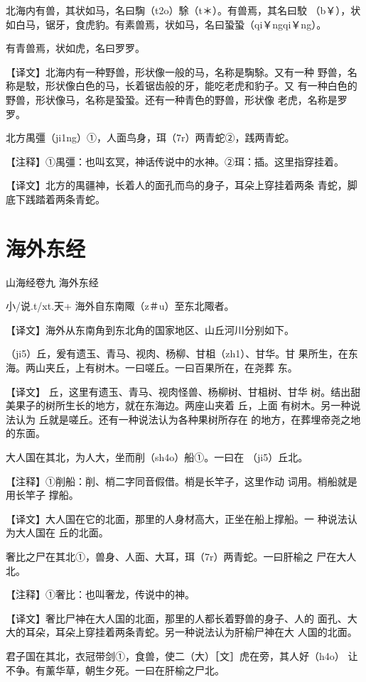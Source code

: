 \documentclass[a4paper,12pt,UTF8,twoside]{ctexbook}
\begin{document}
北海内有兽，其状如马，名曰騊（t2o）駼（t＊）。有兽焉，其名曰駮 （b￥），状如白马，锯牙，食虎豹。有素兽焉，状如马，名曰蛩蛩（qi￥ngqi￥ng）。

有青兽焉，状如虎，名曰罗罗。

【译文】北海内有一种野兽，形状像一般的马，名称是騊駼。又有一种 野兽，名称是駮，形状像白色的马，长着锯齿般的牙，能吃老虎和豹子。又 有一种白色的野兽，形状像马，名称是蛩蛩。还有一种青色的野兽，形状像 老虎，名称是罗罗。

北方禺彊（ji1ng）①，人面鸟身，珥（7r）两青蛇②，践两青蛇。

【注释】①禺彊：也叫玄冥，神话传说中的水神。②珥：插。这里指穿挂着。

【译文】北方的禺疆神，长着人的面孔而鸟的身子，耳朵上穿挂着两条 青蛇，脚底下践踏着两条青蛇。

\chapter{海外东经}

山海经卷九 海外东经

小/说.t/xt.天+
海外自东南陬（z＃u）至东北陬者。

【译文】海外从东南角到东北角的国家地区、山丘河川分别如下。

（ji5）丘，爰有遗玉、青马、视肉、杨柳、甘柤（zh1）、甘华。甘 果所生，在东海。两山夹丘，上有树木。一曰嗟丘。一曰百果所在，在尧葬 东。

【译文】 丘，这里有遗玉、青马、视肉怪兽、杨柳树、甘柤树、甘华 树。结出甜美果子的树所生长的地方，就在东海边。两座山夹着 丘，上面 有树木。另一种说法认为 丘就是嗟丘。还有一种说法认为各种果树所存在 的地方，在葬埋帝尧之地的东面。

大人国在其北，为人大，坐而削（sh4o）船①。一曰在 （ji5）丘北。

【注释】①削船：削、梢二字同音假借。梢是长竿子，这里作动 词用。梢船就是用长竿子 撑船。

【译文】大人国在它的北面，那里的人身材高大，正坐在船上撑船。一 种说法认为大人国在 丘的北面。

奢比之尸在其北①，兽身、人面、大耳，珥（7r）两青蛇。一曰肝榆之 尸在大人北。

【注释】①奢比：也叫奢龙，传说中的神。

【译文】奢比尸神在大人国的北面，那里的人都长着野兽的身子、人的 面孔、大大的耳朵，耳朵上穿挂着两条青蛇。另一种说法认为肝榆尸神在大 人国的北面。

君子国在其北，衣冠带剑①，食兽，使二（大）［文］虎在旁，其人好（h4o） 让不争。有薰华草，朝生夕死。一曰在肝榆之尸北。
\end{document}
